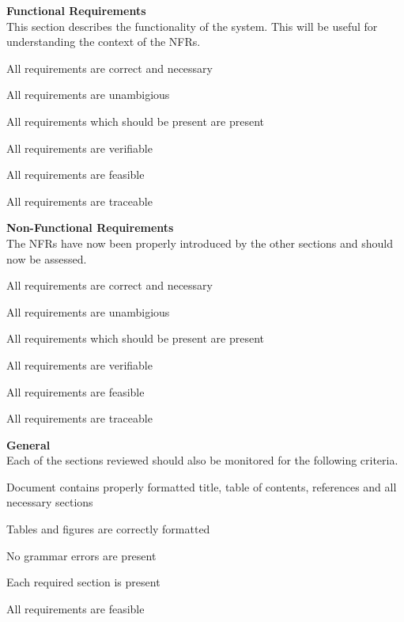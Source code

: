 \documentclass[12pt, titlepage]{article}
\begin{document}
\textbf{Functional Requirements}\\
This section describes the functionality of the system. This will be useful for understanding the context of the NFRs.
\begin{todolist}
\item All requirements are correct and necessary
\item All requirements are unambigious
\item All requirements which should be present are present
\item All requirements are verifiable
\item All requirements are feasible
\item All requirements are traceable
\end{todolist}
\textbf{Non-Functional Requirements}\\
The NFRs have now been properly introduced by the other sections and should now be assessed.
\begin{todolist}
  \item All requirements are correct and necessary
  \item All requirements are unambigious
  \item All requirements which should be present are present
  \item All requirements are verifiable
  \item All requirements are feasible
  \item All requirements are traceable
  \end{todolist}
\textbf{General}\\
Each of the sections reviewed should also be monitored for the following criteria.
\begin{todolist}
  \item Document contains properly formatted title, table of contents, references and all necessary sections
  \item Tables and figures are correctly formatted
  \item No grammar errors are present
  \item Each required section is present
  \item All requirements are feasible
  \end{todolist}


\end{document}
